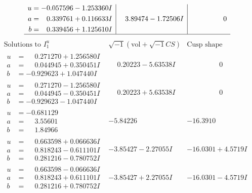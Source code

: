 \documentclass[1p]{elsarticle_modified}
\theoremstyle{definition}
\newcommand{\I}{\sqrt{-1}}
\begin{document}
$$\begin{array}{c|c|c}
\begin{aligned}
u &= -0.057596 - 1.253360 I \\
a &= \phantom{-}0.339761 + 0.116633 I \\
b &= \phantom{-}0.339456 + 1.125610 I\end{aligned}
 & \phantom{-}3.89474 - 1.72506 I & \phantom{-0.000000 } 0\\
 \hline 
 \end{array}$$\newpage$$\begin{array}{c|c|c}  
\text{Solutions to }I^u_{1}& \I (\text{vol} + \sqrt{-1}CS) & \text{Cusp shape}\\
 \hline 
\begin{aligned}
u &= \phantom{-}0.271270 + 1.256580 I \\
a &= \phantom{-}0.044945 + 0.350451 I \\
b &= -0.929623 + 1.047440 I\end{aligned}
 & \phantom{-}0.20223 - 5.63538 I & \phantom{-0.000000 } 0 \\ \hline\begin{aligned}
u &= \phantom{-}0.271270 - 1.256580 I \\
a &= \phantom{-}0.044945 - 0.350451 I \\
b &= -0.929623 - 1.047440 I\end{aligned}
 & \phantom{-}0.20223 + 5.63538 I & \phantom{-0.000000 } 0 \\ \hline\begin{aligned}
u &= -0.681129\phantom{ +0.000000I} \\
a &= \phantom{-}3.55601\phantom{ +0.000000I} \\
b &= \phantom{-}1.84966\phantom{ +0.000000I}\end{aligned}
 & -5.84226\phantom{ +0.000000I} & -16.3910\phantom{ +0.000000I} \\ \hline\begin{aligned}
u &= \phantom{-}0.663598 + 0.066636 I \\
a &= \phantom{-}0.818243 - 0.611101 I \\
b &= \phantom{-}0.281216 - 0.780752 I\end{aligned}
 & -3.85427 - 2.27055 I & -16.0301 + 4.5719 I \\ \hline\begin{aligned}
u &= \phantom{-}0.663598 - 0.066636 I \\
a &= \phantom{-}0.818243 + 0.611101 I \\
b &= \phantom{-}0.281216 + 0.780752 I\end{aligned}
 & -3.85427 + 2.27055 I & -16.0301 - 4.5719 I \\ \hline\begin{aligned}

\end{aligned}
\end{array}$$
\end{document}
